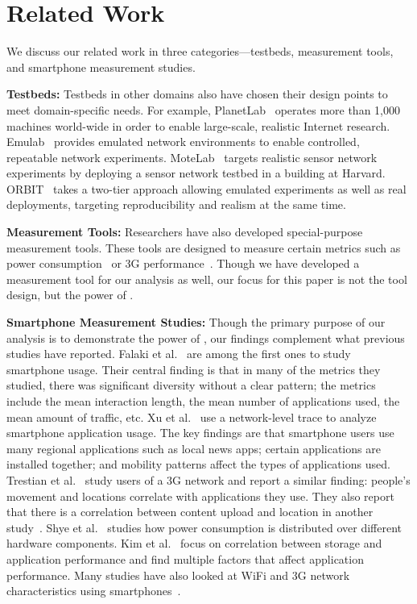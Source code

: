 \section{Related Work}
\label{sec:related}
We discuss our related work in three categories---testbeds, measurement tools,
and smartphone measurement studies.

{\bf Testbeds:} Testbeds in other domains also have chosen their design points
to meet domain-specific needs. For example, PlanetLab~\cite{peterson:ccr:2003,
planetlab} operates more than 1,000 machines world-wide in order to enable
large-scale, realistic Internet research. Emulab~\cite{white:osdi:2002, emulab}
provides emulated network environments to enable controlled, repeatable network
experiments. MoteLab~\cite{werner-allen:ipsn:2005} targets realistic sensor
network experiments by deploying a sensor network testbed in a building at
Harvard. ORBIT~\cite{raychaudhuri:tridentcom:2005} takes a two-tier approach
allowing emulated experiments as well as real deployments, targeting
reproducibility and realism at the same time.

{\bf Measurement Tools:} Researchers have also developed special-purpose
measurement tools. These tools are designed to measure certain metrics such as
power consumption~\cite{zhang:codes:2010, pathak:eurosys:2012} or 3G
performance~\cite{huang:mobisys:2010}. Though we have developed a measurement
tool for our analysis as well, our focus for this paper is not the tool design,
but the power of \PhoneLab{}.

{\bf Smartphone Measurement Studies:}
Though the primary purpose of our analysis is to demonstrate the power of
\PhoneLab{}, our findings complement what previous studies have reported. Falaki
et al.~\cite{falaki:mobisys:2010} are among the first ones to study smartphone
usage. Their central finding is that in many of the metrics they studied, there
was significant diversity without a clear pattern; the metrics include the mean
interaction length, the mean number of applications used, the mean amount of
traffic, etc. Xu et al.~\cite{xu:imc:2011} use a network-level trace to analyze
smartphone application usage. The key findings are that smartphone users use
many regional applications such as local news apps; certain applications are
installed together; and mobility patterns affect the types of applications
used. Trestian et al.~\cite{trestian:imc:2009} study users of a 3G network and
report a similar finding: people's movement and locations correlate with
applications they use. They also report that there is a correlation between
content upload and location in another study~\cite{trestian:ton:2012}. Shye et
al.~\cite{shye:micro:2009} studies how power consumption is distributed over
different hardware components. Kim et al.~\cite{kim:fast:2012} focus on
correlation between storage and application performance and find multiple
factors that affect application performance. Many studies have also looked at
WiFi and 3G network characteristics using
smartphones~\cite{keralapura:mobicom:2010, maier:pam:2010, gember:pam:2011}.

